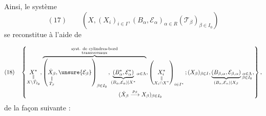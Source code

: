 Ainsi, le système
\[
(17)\qquad
(X,(X_i)_{i\in I},(B_\alpha,\mathcal E_\alpha)_{\alpha\in R}
(\mathcal T_\beta)_{\beta\in I_0})
\]
se reconstitue à l'aide de

\[
(18)\quad\left\{
\begin{gathered}
\underset{\substack{\parallel\\X\setminus\mathring T_{I_0}}}{X^*},
\overbrace{
\left(\underset{\substack{\parallel\\\dot T_\beta}}{\dot X_\beta},
\unsure{\mathcal E_\beta}\right)_{\beta\in I_0},
\underbrace{(B_\alpha^*,\mathcal E_\alpha^*)}
_{(B_\alpha,\mathcal E_\alpha)|X^*}{}_{\alpha\in\Lambda}
}^{\substack{\text{syst. de cylindres-bord}\\\text{transversaux}}},
\left(\underset{\substack{\parallel\\X_i\cap X^*}}{X_i^*}\right)_{i\in I^*};
(X_\beta)_{\beta\in I},
\underbrace{(B_{\beta,\alpha},\mathcal E_{\beta,\alpha})}
_{(B_\alpha,\mathcal E_\alpha)|X_\beta}
{}_{\substack{\alpha\in\Lambda\\\beta\in I_0}},\\
(\dot X_\beta\overset{p_\beta}\longrightarrow X_\beta)_{\beta\in I_0}
\end{gathered}\right\},
\]
de la façon suivante :

